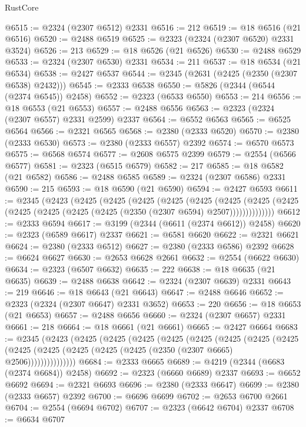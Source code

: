 \begin{lexlean}{RustCore}
\begin{coremodule}
@6515 := @2324 (@2307 @6512) @2331
@6516 := 212
@6519 := @18 @6516 (@21 @6516)
@6520 := @2488 @6519
@6525 := @2323 (@2324 (@2307 @6520) @2331 @3524)
@6526 := 213
@6529 := @18 @6526 (@21 @6526)
@6530 := @2488 @6529
@6533 := @2324 (@2307 @6530) @2331
@6534 := 211
@6537 := @18 @6534 (@21 @6534)
@6538 := @2427 @6537
@6544 := @2345 (@2631 (@2425 (@2350 (@2307 @6538) @2432)))
@6545 := @2333 @6538
@6550 := @5826 (@2344 (@6544 (@2374 @6545)) @2458)
@6552 := @2323 (@6533 @6550)
@6553 := 214
@6556 := @18 @6553 (@21 @6553)
@6557 := @2488 @6556
@6563 := @2323 (@2324 (@2307 @6557) @2331 @2599) @2337
@6564 := @6552 @6563
@6565 := @6525 @6564
@6566 := @2321 @6565
@6568 := @2380 (@2333 @6520)
@6570 := @2380 (@2333 @6530)
@6573 := @2380 (@2333 @6557) @2392
@6574 := @6570 @6573
@6575 := @6568 @6574
@6577 := @2608 @6575 @2399
@6579 := @2554 (@6566 @6577)
@6581 := @2323 (@6515 @6579)
@6582 := 217
@6585 := @18 @6582 (@21 @6582)
@6586 := @2488 @6585
@6589 := @2324 (@2307 @6586) @2331
@6590 := 215
@6593 := @18 @6590 (@21 @6590)
@6594 := @2427 @6593
@6611 := @2345
    (@2423
      (@2425
        (@2425
          (@2425
            (@2425
              (@2425
                (@2425
                  (@2425 (@2425 (@2425 (@2425 (@2425 (@2425 (@2350 (@2307 @6594) @2507))))))))))))))
@6612 := @2333 @6594
@6617 := @3199 (@2344 (@6611 (@2374 @6612)) @2458)
@6620 := @2323 (@6589 @6617) @2337
@6621 := @6581 @6620
@6622 := @2321 @6621
@6624 := @2380 (@2333 @6512)
@6627 := @2380 (@2333 @6586) @2392
@6628 := @6624 @6627
@6630 := @2653 @6628 @2661
@6632 := @2554 (@6622 @6630)
@6634 := @2323 (@6507 @6632)
@6635 := 222
@6638 := @18 @6635 (@21 @6635)
@6639 := @2488 @6638
@6642 := @2324 (@2307 @6639) @2331
@6643 := 219
@6646 := @18 @6643 (@21 @6643)
@6647 := @2488 @6646
@6652 := @2323 (@2324 (@2307 @6647) @2331 @3652)
@6653 := 220
@6656 := @18 @6653 (@21 @6653)
@6657 := @2488 @6656
@6660 := @2324 (@2307 @6657) @2331
@6661 := 218
@6664 := @18 @6661 (@21 @6661)
@6665 := @2427 @6664
@6683 := @2345
    (@2423
      (@2425
        (@2425
          (@2425
            (@2425
              (@2425
                (@2425
                  (@2425
                    (@2425
                      (@2425 (@2425 (@2425 (@2425 (@2425 (@2350 (@2307 @6665) @2506)))))))))))))))
@6684 := @2333 @6665
@6689 := @4219 (@2344 (@6683 (@2374 @6684)) @2458)
@6692 := @2323 (@6660 @6689) @2337
@6693 := @6652 @6692
@6694 := @2321 @6693
@6696 := @2380 (@2333 @6647)
@6699 := @2380 (@2333 @6657) @2392
@6700 := @6696 @6699
@6702 := @2653 @6700 @2661
@6704 := @2554 (@6694 @6702)
@6707 := @2323 (@6642 @6704) @2337
@6708 := @6634 @6707

\end{coremodule}
\end{lexlean}
